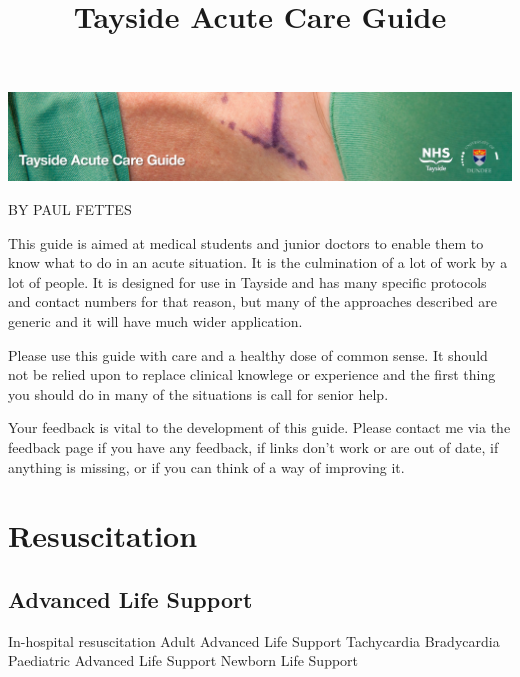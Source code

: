 \documentclass[]{book}
\title{Tayside Acute Care Guide}
\author{}
\date{}
\begin{document}
\maketitle

{
\setcounter{tocdepth}{1}
\tableofcontents
}
\hypertarget{section}{%
\chapter*{}\label{section}}

\includegraphics[width=1\linewidth]{banner-acute-care-guide}

BY PAUL FETTES

This guide is aimed at medical students and junior doctors to enable them to know what to do in an acute situation. It is the culmination of a lot of work by a lot of people. It is designed for use in Tayside and has many specific protocols and contact numbers for that reason, but many of the approaches described are generic and it will have much wider application.

Please use this guide with care and a healthy dose of common sense. It should not be relied upon to replace clinical knowlege or experience and the first thing you should do in many of the situations is call for senior help.

Your feedback is vital to the development of this guide.
Please contact me via the feedback page if you have any feedback, if links don't work or are out of date, if anything is missing, or if you can think of a way of improving it.

\hypertarget{resuscitation}{%
\chapter{Resuscitation}\label{resuscitation}}

\hypertarget{advanced-life-support}{%
\section{Advanced Life Support}\label{advanced-life-support}}

In-hospital resuscitation
Adult Advanced Life Support
Tachycardia
Bradycardia
Paediatric Advanced Life Support
Newborn Life Support
\end{document}
